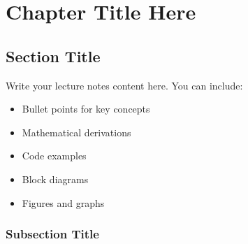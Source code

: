 \documentclass{../coursenotes}
\begin{document}

\makealllists


\chapter{Chapter Title Here} \label{chap:chapter1}


\section{Section Title} \label{sec:section1}

Write your lecture notes content here. You can include:
\begin{itemize}
\item Bullet points for key concepts
\item Mathematical derivations
\item Code examples
\item Block diagrams
\item Figures and graphs
\end{itemize}


\subsection{Subsection Title}
\end{document}
